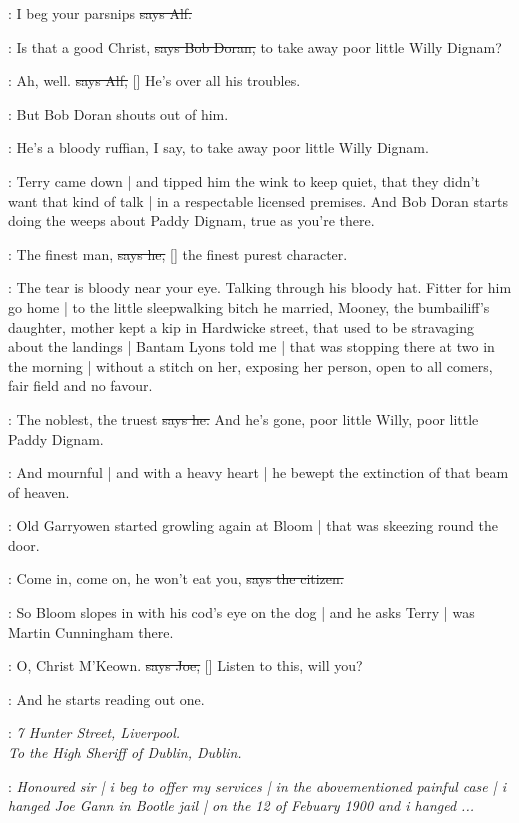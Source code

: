 \bergan:
I beg your parsnips
\sout{says Alf.}

\doran:
Is that a good Christ,
\sout{says Bob Doran,}
to take away poor little Willy Dignam?

\bergan:
Ah,
well.
\sout{says Alf,}
[]
He's over all his troubles.

\Nq:
But Bob Doran shouts out of him.

\doran:
He's a bloody ruffian,
I say,
to take away poor little Willy Dignam.

\Nq:
Terry came down |
and tipped him the wink to keep quiet,
that they didn't want that kind of talk |
in a respectable licensed premises.
And Bob Doran starts doing the weeps about Paddy Dignam,
true as you're there.

\doran:
The finest man,
\sout{says he,}
[] the finest purest character.

\Nq:
The tear is bloody near your eye.
Talking through his bloody hat.
Fitter for him go home |
to the little sleepwalking bitch he married,
Mooney,
the bumbailiff's daughter,
mother kept a kip in Hardwicke street,
that used to be stravaging about the landings |
Bantam Lyons told me |
that was stopping there at two in the morning |
without a stitch on her,
exposing her person,
open to all comers,
fair field and no favour.

\doran:
The noblest,
the truest
\sout{says he.}
And he's gone,
poor little Willy,
poor little Paddy Dignam.

:
And mournful |
and with a heavy heart |
he bewept the extinction of that beam of heaven.

\Nq:
Old Garryowen started growling again at Bloom |
that was skeezing round the door.

\citizen:
Come in,
come on,
he won't eat you,
\sout{says the citizen.}

\Nq:
So Bloom slopes in with his cod's eye on the dog |
and he asks Terry |
was Martin Cunningham there.

\joe:
O,
Christ M'Keown.
\sout{says Joe,}
[]
Listen to this,
will you?

\Nq:
And he starts reading out one.


\joe:
\emph{7 Hunter Street,
Liverpool.\\
To the High Sheriff of Dublin,
Dublin.}

\joe:
\emph{Honoured sir |
i beg to offer my services |
in the abovementioned painful case |
i hanged Joe Gann in Bootle jail |
on the 12 of Febuary 1900
and i hanged ...}

